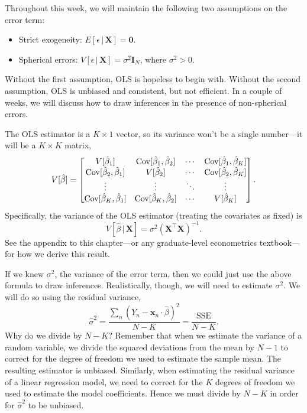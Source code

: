 \documentclass[12pt,oneside,openany]{book}
\begin{document}
Throughout this week, we will maintain the following two assumptions on
the error term:

\begin{itemize}
\item
  Strict exogeneity: \(E[\epsilon \,|\, \mathbf{X}] = \mathbf{0}\).
\item
  Spherical errors:
  \(V[\epsilon \,|\, \mathbf{X}] = \sigma^2 \mathbf{I}_N\), where
  \(\sigma^2 > 0\).
\end{itemize}

Without the first assumption, OLS is hopeless to begin with. Without the
second assumption, OLS is unbiased and consistent, but not efficient. In
a couple of weeks, we will discuss how to draw inferences in the
presence of non-spherical errors.

The OLS estimator is a \(K \times 1\) vector, so its variance won't be a
single number---it will be a \(K \times K\) matrix, \[
V[\hat{\beta}] = \begin{bmatrix}
  V[\hat{\beta}_1] & \mathop{\rm Cov}\nolimits[\hat{\beta}_1, \hat{\beta}_2] & \cdots & \mathop{\rm Cov}\nolimits[\hat{\beta}_1, \hat{\beta}_K] \\
  \mathop{\rm Cov}\nolimits[\hat{\beta}_2, \hat{\beta}_1] & V[\hat{\beta}_2] & \cdots & \mathop{\rm Cov}\nolimits[\hat{\beta}_2, \hat{\beta}_K] \\
  \vdots & \vdots & \ddots & \vdots \\
  \mathop{\rm Cov}\nolimits[\hat{\beta}_K, \hat{\beta}_1] & \mathop{\rm Cov}\nolimits[\hat{\beta}_K, \hat{\beta}_2] & \cdots & V[\hat{\beta}_K] \\
\end{bmatrix}.
\] Specifically, the variance of the OLS estimator (treating the
covariates as fixed) is \[
V[\hat{\beta} \,|\, \mathbf{X}] = \sigma^2 (\mathbf{X}^\top \mathbf{X})^{-1}.
\] See the appendix to this chapter---or any graduate-level econometrics
textbook---for how we derive this result.

If we knew \(\sigma^2\), the variance of the error term, then we could
just use the above formula to draw inferences. Realistically, though, we
will need to estimate \(\sigma^2\). We will do so using the residual
variance, \[
\hat{\sigma}^2
= \frac{\sum_n (Y_n - \mathbf{x}_n \cdot \hat{\beta})^2}{N - K}
= \frac{\text{SSE}}{N - K}.
\] Why do we divide by \(N - K\)? Remember that when we estimate the
variance of a random variable, we divide the squared deviations from the
mean by \(N - 1\) to correct for the degree of freedom we used to
estimate the sample mean. The resulting estimator is unbiased.
Similarly, when estimating the residual variance of a linear regression
model, we need to correct for the \(K\) degrees of freedom we used to
estimate the model coefficients. Hence we must divide by \(N - K\) in
order for \(\hat{\sigma}^2\) to be unbiased.
\end{document}

